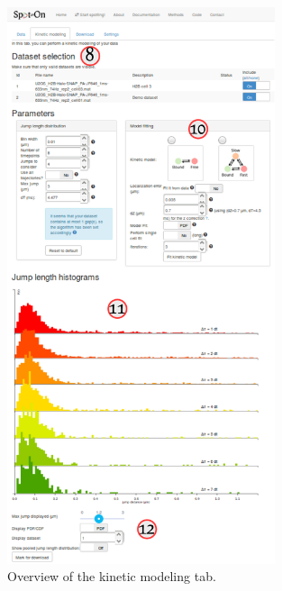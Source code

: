 \begin{figure}[h!]
\centering
\includegraphics[width=0.7\textwidth]{../SPTGUI/static/SPTGUI/img/tutorial/0.7/tuto4.png}
\caption{\label{fig:tuto4}Overview of the kinetic modeling tab.}
\end{figure}


